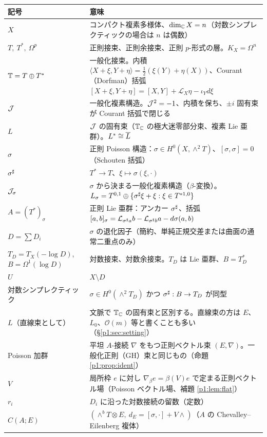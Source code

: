 \begin{longtable}{>{\raggedright\arraybackslash}p{3.4cm}>{\raggedright\arraybackslash}p{11.6cm}}
\toprule 記号 & 意味\\ \midrule\endhead
$X$ & コンパクト複素多様体、$\dim_\mathbb C X=n$（対数シンプレクティックの場合は $n$ は偶数）\\
$T,\ T^*,\ \Omega^p$ & 正則接束、正則余接束、正則 $p$-形式の層。$K_X=\Omega^n$\\
$\mathbb T=T\oplus T^*$ & 一般化接束。内積 $\langle X+\xi,Y+\eta\rangle=\tfrac12(\xi(Y)+\eta(X))$、Courant（Dorfman）括弧 $[X+\xi,Y+\eta]=[X,Y]+\mathcal L_X\eta-\iota_Yd\xi$\\
$\mathcal J$ & 一般化複素構造。$\mathcal J^2=-1$、内積を保ち、$\pm i$ 固有束が Courant 括弧で閉じる\\
$L$ & $\mathcal J$ の固有束（$\mathbb T_\mathbb C$ の極大迷零部分束、複素 Lie 亜群）。$L^*\cong\overline L$\\
$\sigma$ & 正則 Poisson 構造：$\sigma\in H^0(X,\wedge^2T)$、$[\sigma,\sigma]=0$（Schouten 括弧）\\
$\sigma^\sharp$ & $T^*\to T$、$\xi\mapsto\sigma(\xi,\cdot)$\\
$\mathcal J_\sigma$ & $\sigma$ から決まる一般化複素構造（$\beta$-変換）。$L_\sigma=T^{0,1}\oplus\{\sigma^\sharp\xi+\xi:\xi\in T^{*1,0}\}$\\
$A=(T^*)_\sigma$ & 正則 Lie 亜群：アンカー $\sigma^\sharp$、括弧 $[a,b]_\sigma=\mathcal L_{\sigma^\sharp a}b-\mathcal L_{\sigma^\sharp b}a-d\sigma(a,b)$\\
$D=\sum D_i$ & $\sigma$ の退化因子（簡約、単純正規交差または曲面の通常二重点のみ）\\
$T_D=T_X(-\log D)$,\ $B=\Omega^1(\log D)$ & 対数接束、対数余接束。$T_D$ は Lie 亜群、$B=T_D^*$\\
$U$ & $X\setminus D$\\
対数シンプレクティック & $\sigma\in H^0(\wedge^2T_D)$ かつ $\sigma^\sharp:B\to T_D$ が同型\\
$L$（直線束として）& 文脈で $\mathbb T_\mathbb C$ の固有束と区別する。直線束の方は $E$、$L_0$、$\mathcal O(m)$ 等と書くことも多い（\S\ref{p1:sec:setting}）\\
Poisson 加群 & 平坦 $A$-接続 $\nabla$ をもつ正則ベクトル束 $(E,\nabla)$。一般化正則（GH）束と同じもの（命題 \ref{p1:prop:ident}）\\
$V$ & 局所枠 $e$ に対し $\nabla_\beta e=\beta(V)e$ で定まる正則ベクトル場（Poisson ベクトル場、補題 \ref{p1:lem:flat}）\\
$r_i$ & $D_i$ に沿った対数接続の留数（定数）\\
$C(A;E)$ & $(\wedge^bT\otimes E,\ d_E=[\sigma,\cdot]+V\wedge)$（$A$ の Chevalley--Eilenberg 複体）\\

\end{longtable}
